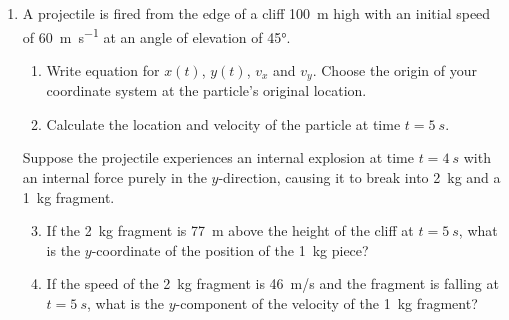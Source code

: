 \documentclass{../../oss-apphys}
\begin{document}
\begin{enumerate}[leftmargin=15pt]
\item A projectile is fired from the edge of a cliff \SI{100}{\metre} high with
  an initial speed of \SI{60}{\metre\per\second} at an angle of elevation of
  \ang{45}.
  \begin{enumerate}[noitemsep]
  \item Write equation for $x(t)$, $y(t)$, $v_x$ and $v_y$. Choose the origin of
    your coordinate system at the particle's original location.
    \vspace{1.25in}
  \item Calculate the location and velocity of the particle at time
    $t=\SI{5}{s}$.
    \vspace{1.25in}
  \end{enumerate}
  Suppose the projectile experiences an internal explosion at time $t=\SI{4}{s}$
  with an internal force purely in the $y$-direction, causing it to break into
  \SI{2}{\kg} and a \SI{1}{\kg} fragment.
  \begin{enumerate}[noitemsep]
    \setcounter{enumii}{2}

  \item If the \SI{2}{\kg} fragment is \SI{77}{m} above the height of the
    cliff at $t=\SI{5}{s}$, what is the $y$-coordinate of the position of the
    \SI{1}{\kg} piece?
    \vspace{1.25in}
  \item If the speed of the \SI{2}{kg} fragment is \SI{46}{m/s} and the
    fragment is falling at $t=\SI{5}{s}$, what is the $y$-component of the
    velocity of the \SI{1}{kg} fragment?
  \end{enumerate}
  \newpage
  

\end{enumerate}
\end{document}
